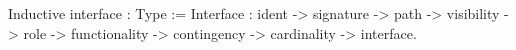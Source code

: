 Inductive interface : Type :=
    Interface : ident -> signature -> path           ->
                visibility -> role -> functionality  -> 
                contingency -> cardinality           -> interface.